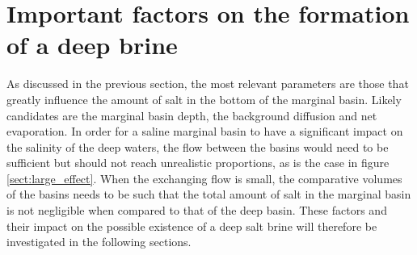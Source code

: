 \documentclass[twocolumn]{article}
\begin{document}
\section{Important factors on the formation of a deep brine}
\label{sect:imprtant_parameters}
As discussed in the previous section, the most relevant parameters are those that greatly influence the amount of salt in the bottom of the marginal basin. Likely candidates are the marginal basin depth, the background diffusion and net evaporation. In order for a saline marginal basin to have a significant impact on the salinity of the deep waters, the flow between the basins would need to be sufficient but should not reach unrealistic proportions, as is the case in figure \ref{sect:large_effect}. When the exchanging flow is small, the comparative volumes of the basins needs to be such that the total amount of salt in the marginal basin is not negligible when compared to that of the deep basin. These factors and their impact on the possible existence of a deep salt brine will therefore be investigated in the following sections.

\end{document}
